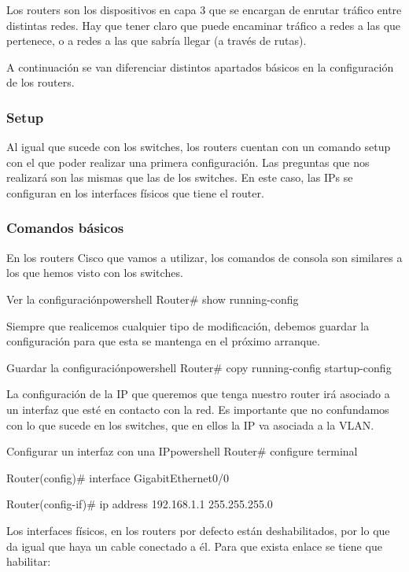 Los routers son los dispositivos en capa 3 que se encargan de enrutar tráfico entre distintas redes. Hay que tener claro que puede encaminar tráfico a redes a las que pertenece, o a redes a las que sabría llegar (a través de rutas).

A continuación se van diferenciar distintos apartados básicos en la configuración de los routers.

\subsubsection{Setup}
Al igual que sucede con los switches, los routers cuentan con un comando setup con el que poder realizar una primera configuración. Las preguntas que nos realizará son las mismas que las de los switches.
En este caso, las IPs se configuran en los interfaces físicos que tiene el router.


\subsubsection{Comandos básicos}
En los routers Cisco que vamos a utilizar, los comandos de consola son similares a los que hemos visto con los switches.

\begin{mycode}{Ver la configuración}{powershell}{}
Router# show running-config
\end{mycode}

Siempre que realicemos cualquier tipo de modificación, debemos guardar la configuración para que esta se mantenga en el próximo arranque.

\begin{mycode}{Guardar la configuración}{powershell}{}
Router# copy running-config startup-config
\end{mycode}

La configuración de la IP que queremos que tenga nuestro router irá asociado a un interfaz que esté en contacto con la red. Es importante que no confundamos con lo que sucede en los switches, que en ellos la IP va asociada a la VLAN.

\begin{mycode}{Configurar un interfaz con una IP}{powershell}{}
Router# configure terminal

Router(config)# interface GigabitEthernet0/0

Router(config-if)# ip address 192.168.1.1 255.255.255.0
\end{mycode}

Los interfaces físicos, en los routers por defecto están deshabilitados, por lo que da igual que haya un cable conectado a él. Para que exista enlace se tiene que habilitar:


